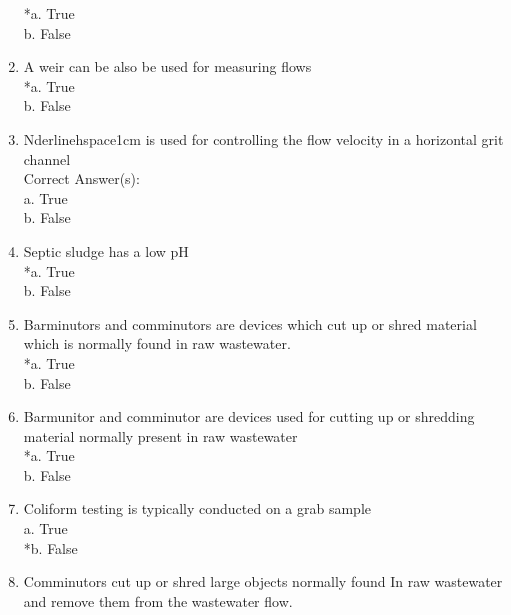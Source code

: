 \begin{enumerate}
*a. True \\
b. False 

\vspace{0.4cm}
\item  A weir can be also be used for measuring flows \\

*a. True \\
b. False 

\vspace{0.4cm}
\item  {Nderline{hspace{1cm}}} is used for controlling the flow velocity in a horizontal grit channel \\

Correct Answer(s):\\
a. True\\
b. False 

\vspace{0.4cm}
\item  Septic sludge has a low pH \\

*a. True \\
b. False 

\vspace{0.4cm}
\item  Barminutors and comminutors are devices which cut up or shred material which is normally found in raw wastewater. \\

*a. True \\
b. False 

\vspace{0.4cm}
\item  Barmunitor and comminutor are devices used for cutting up or shredding material normally present in raw wastewater \\

*a. True \\
b. False 

\vspace{0.4cm}
\item  Coliform testing is typically conducted on a grab sample \\

a. True \\
*b. False 

\vspace{0.4cm}
\item  Comminutors cut up or shred large objects normally found In raw wastewater and remove them from the wastewater flow. \\


\end{enumerate}
